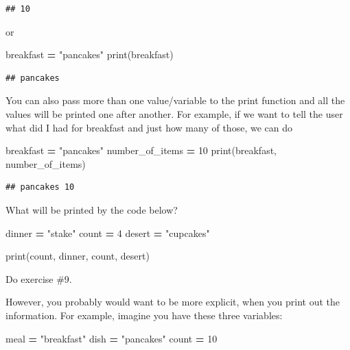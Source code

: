 \documentclass[
]{book}
\newenvironment{Shaded}{\begin{snugshade}}{\end{snugshade}}
\newcommand{\BuiltInTok}[1]{#1}
\newcommand{\DecValTok}[1]{\textcolor[rgb]{0.00,0.00,0.81}{#1}}
\newcommand{\NormalTok}[1]{#1}
\newcommand{\OperatorTok}[1]{\textcolor[rgb]{0.81,0.36,0.00}{\textbf{#1}}}
\newcommand{\StringTok}[1]{\textcolor[rgb]{0.31,0.60,0.02}{#1}}
\begin{document}
\begin{verbatim}
## 10
\end{verbatim}

or

\begin{Shaded}
\begin{Highlighting}[]
\NormalTok{breakfast }\OperatorTok{=} \StringTok{"pancakes"}
\BuiltInTok{print}\NormalTok{(breakfast)}
\end{Highlighting}
\end{Shaded}

\begin{verbatim}
## pancakes
\end{verbatim}

You can also pass more than one value/variable to the print function and all the values will be printed one after another. For example, if we want to tell the user what did I had for breakfast and just how many of those, we can do

\begin{Shaded}
\begin{Highlighting}[]
\NormalTok{breakfast }\OperatorTok{=} \StringTok{"pancakes"}
\NormalTok{number\_of\_items }\OperatorTok{=} \DecValTok{10}
\BuiltInTok{print}\NormalTok{(breakfast, number\_of\_items)}
\end{Highlighting}
\end{Shaded}

\begin{verbatim}
## pancakes 10
\end{verbatim}

What will be printed by the code below?

\begin{Shaded}
\begin{Highlighting}[]
\NormalTok{dinner }\OperatorTok{=} \StringTok{"stake"}
\NormalTok{count }\OperatorTok{=} \DecValTok{4}
\NormalTok{desert }\OperatorTok{=} \StringTok{"cupcakes"}

\BuiltInTok{print}\NormalTok{(count, dinner, count, desert)}
\end{Highlighting}
\end{Shaded}

Do exercise \#9.

However, you probably would want to be more explicit, when you print out the information. For example, imagine you have these three variables:

\begin{Shaded}
\begin{Highlighting}[]
\NormalTok{meal }\OperatorTok{=} \StringTok{"breakfast"}
\NormalTok{dish }\OperatorTok{=} \StringTok{"pancakes"}
\NormalTok{count }\OperatorTok{=} \DecValTok{10}
\end{Highlighting}
\end{Shaded}
\end{document}
